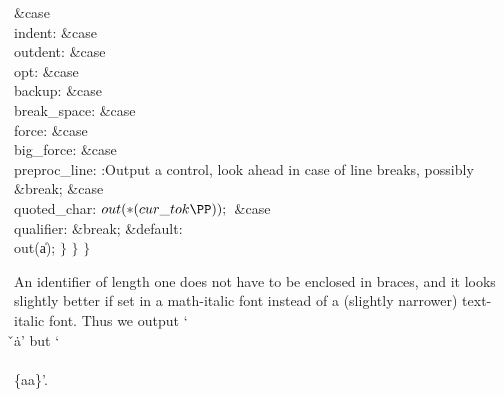 \6
\4\&{case} \\{indent}:\5
\&{case} \\{outdent}:\5
\&{case} \\{opt}:\5
\&{case} \\{backup}:\5
\&{case} \\{break\_space}:\5
\&{case} \\{force}:\5
\&{case} \\{big\_force}:\5
\&{case} \\{preproc\_line}:\5
:Output a control, look ahead in case of line breaks, possibly \X\6
\&{break};\6
\4\&{case} \\{quoted\_char}:\5
${}\\{out}({*}(\\{cur\_tok}\PP));{}$\6
\6
\4\&{case} \\{qualifier}:\5
\&{break};\6
\4\&{default}:\5
\\{out}(\|a);\6
\4${}\}{}$\2\6
\4${}\}{}$\2\6
\4${}\}{}$\2\par
\fi

An identifier of length one does not have to be enclosed in braces, and
it
looks slightly better if set in a math-italic font instead of a (slightly
narrower) text-italic font. Thus we output `\.{\\\v}\.{a}' but
`\.{\\\\\{aa\}}'.

